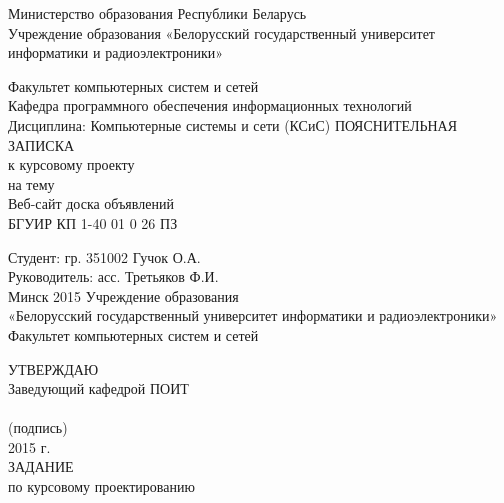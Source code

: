 \documentclass[14pt,a4paper]{extreport}
\title{}
\author{}
\begin{document}
	\center
	Министерство образования Республики Беларусь\\
	Учреждение образования «Белорусский государственный университет информатики и радиоэлектроники»
	\vspace*{2cm}
	\endcenter
	\raggedright
	Факультет компьютерных систем и сетей\\
	\medskip
	Кафедра программного обеспечения информационных технологий\\
	\medskip
	Дисциплина:  Компьютерные системы и сети (КСиС)
	\vspace*{2cm}
	\center
	ПОЯСНИТЕЛЬНАЯ ЗАПИСКА\\
	к курсовому проекту\\
	на тему\\
	\medskip
	Веб-сайт доска объявлений\\
	\medskip
	БГУИР КП  1-40 01 0 26 ПЗ
	\vspace*{4cm}
	\endcenter
	\raggedright
	\hspace*{7.94cm}Студент:  гр. 351002 Гучок О.А.\\
	\bigskip
	\hspace*{7.94cm}Руководитель: асс. Третьяков Ф.И.\\
	\center
	\vspace*{2cm}
	Минск 2015
	\pagestyle{empty}
	\newpage
	\center
	Учреждение образования\\
	\medskip
	«Белорусский государственный университет информатики и радиоэлектроники»\\
	\medskip
	Факультет компьютерных систем и сетей\\
	\medskip
	\endcenter
	\raggedright
	\hspace*{9.53cm}УТВЕРЖДАЮ\\
	\hspace*{9.53cm}Заведующий кафедрой ПОИТ\\
	\hspace*{9.53cm}\underline{\hspace{6cm}} \\
	\hspace*{11cm}\small (подпись) \normalsize\\
	\hspace*{9.53cm}\underline{\hspace{5cm}}2015 г.\\
	\medskip
	\center
	ЗАДАНИЕ\\
	по курсовому проектированию\\
	\medskip
	\endcenter
\end{document}
